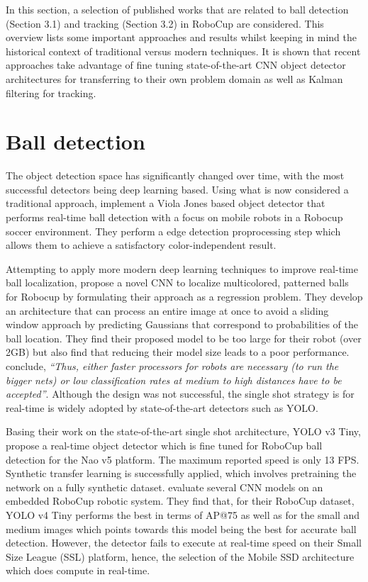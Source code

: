 \documentclass[a4paper,twoside,12pt]{report}
\begin{document}
In this section, a selection of published works that are related to ball detection  (Section 3.1) and tracking (Section 3.2) in RoboCup are considered. This overview lists some important approaches and results whilst keeping in mind the historical context of traditional versus modern techniques. It is shown that recent approaches take advantage of fine tuning state-of-the-art CNN object detector architectures for transferring to their own problem domain as well as Kalman filtering for tracking.

\section{Ball detection}

The object detection space has significantly changed over time, with the most successful detectors being deep learning based. Using what is now considered a traditional approach, \cite{robovj} implement a Viola Jones based object detector that performs real-time ball detection with a focus on mobile robots in a Robocup soccer environment. They perform a edge detection proprocessing step which allows them to achieve a satisfactory color-independent result.

Attempting to apply more modern deep learning techniques to improve real-time ball localization, \cite{selfcnn} propose a novel CNN to localize multicolored, patterned balls for Robocup by formulating their approach as a regression problem. They develop an architecture that can process an entire image at once to avoid a sliding window approach by predicting Gaussians that correspond to probabilities of the ball location. They find their proposed model to be too large for their robot (over 2GB) but also find that reducing their model size leads to a poor performance. \cite{selfcnn} conclude, \textit{``Thus, either faster processors for robots are necessary (to run the bigger nets) or low classification rates at medium to high distances have to be accepted''}. Although the design was not successful, the single shot strategy is for real-time is widely adopted by state-of-the-art detectors such as YOLO.

Basing their work on the state-of-the-art single shot architecture, YOLO v3 Tiny, \cite{robo} propose a real-time object detector which is fine tuned for RoboCup ball detection for the Nao v5 platform. The maximum reported speed is only 13 FPS. Synthetic transfer learning is successfully applied, which involves pretraining the network on a fully synthetic dataset. \cite{robocupdataset} evaluate several CNN models on an embedded RoboCup robotic system. They find that, for their RoboCup dataset, YOLO v4 Tiny performs the best in terms of AP@75 as well as for the small and medium images which points towards this model being the best for accurate ball detection. However, the detector fails to execute at real-time speed on their Small Size League (SSL) platform, hence, the selection of the Mobile SSD architecture which does compute in real-time.
\end{document}
